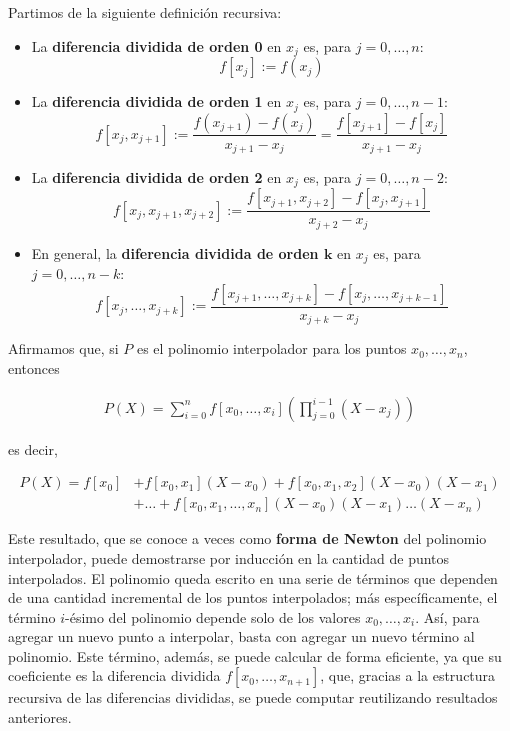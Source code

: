 Partimos de la siguiente definición recursiva:
\begin{itemize}
\item La \textbf{diferencia dividida de orden 0} en $x_j$ es, para $j = 0,
    \dots, n$:
    \[f[x_j] := f(x_j)\]
\item La \textbf{diferencia dividida de orden 1} en $x_j$ es, para $j = 0,
    \dots, n-1$:
    \[f[x_j,x_{j+1}]
        := \frac{f(x_{j+1}) - f(x_j)}{x_{j+1} - x_j}
        = \frac{f[x_{j+1}] - f[x_j]}{x_{j+1} - x_j}\]
\item La \textbf{diferencia dividida de orden 2} en $x_j$ es, para $j = 0,
    \dots, n-2$:
    \[f[x_j,x_{j+1},x_{j+2}]
        := \frac{f[x_{j+1},x_{j+2}] - f[x_j,x_{j+1}]}{x_{j+2} - x_j}\]
\item En general, la \textbf{diferencia dividida de orden $\bm{k}$} en $x_j$
    es, para $j = 0, \dots, n-k$:
    \[f[x_j,\dots,x_{j+k}]
        := \frac{f[x_{j+1},\dots,x_{j+k}] - f[x_j,\dots,x_{j+k-1}]}{x_{j+k} - x_j}\]
\end{itemize}

Afirmamos que, si $P$ es el polinomio interpolador para los puntos $x_0, \dots,
x_n$, entonces

\[ \begin{aligned}
P(X) = \sum_{i=0}^n f[x_0,\dots,x_i] \left( \prod_{j=0}^{i-1} (X - x_j) \right)
\end{aligned} \]

es decir,

\[ \begin{aligned}
P(X) = f[x_0] &+ f[x_0,x_1] (X - x_0) + f[x_0,x_1,x_2] (X - x_0) (X - x_1) \\
       &+ \dots + f[x_0,x_1,\dots,x_n] (X - x_0) (X - x_1) \dots (X - x_n)
\end{aligned} \]

Este resultado, que se conoce a veces como \textbf{forma de Newton} del
polinomio interpolador, puede demostrarse por inducción en la cantidad de
puntos interpolados. El polinomio queda escrito en una serie de términos que
dependen de una cantidad incremental de los puntos interpolados; más
específicamente, el término $i$-ésimo del polinomio depende solo de los
valores $x_0,\dots,x_i$. Así, para agregar un nuevo punto a interpolar, basta
con agregar un nuevo término al polinomio. Este término, además, se puede
calcular de forma eficiente, ya que su coeficiente es la
diferencia dividida $f[x_0, \dots, x_{n+1}]$, que, gracias a la estructura
recursiva de las diferencias divididas, se puede computar reutilizando
resultados anteriores.

